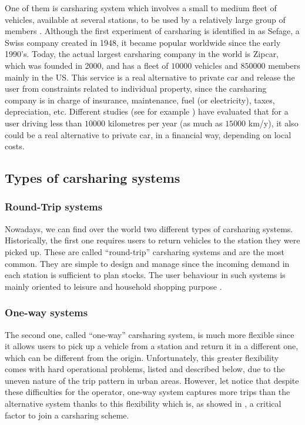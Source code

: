 \begin{bibunit}[ieeetr]
One of them is carsharing system which involves a small to medium fleet of vehicles, available at several stations, to be used by a relatively large group of members \cite{shaheen_short_1999}.
Although the first experiment of carsharing is identified in \cite{shaheen_short_1999} as Sefage, a Swiss company created in 1948, it became popular worldwide since the early 1990's.
Today, the actual largest carsharing company in the world is Zipcar, which was founded in 2000, and has a fleet of $10 000$ vehicles and $850 000$ members mainly in the US. %
This service is a real alternative to private car and release the user from constraints related to individual property, since the carsharing company is in charge of insurance, maintenance, fuel (or electricity), taxes, depreciation, etc.
Different studies (see for example \cite{litman_evaluating_2000, prettenthaler_ownership_1999}) have evaluated that for a user driving less than $10 000$ kilometres per year (as much as $15 000$ km/y), it also could be a real alternative to private car, in a financial way, depending on local costs.

\subsection{Types of carsharing systems}

\subsubsection{Round-Trip systems}
Nowadays, we can find over the world two different types of carsharing systems.
Historically, the first one requires users to return vehicles to the station they were picked up.
These are called ``round-trip'' carsharing systems and are the most common.
They are simple to design and manage since the incoming demand in each station is sufficient to plan stocks.
The user behaviour in such systems is mainly oriented to leisure and household shopping purpose \cite{barth_shared_use_2002, costain_synopsis_2012}.

\subsubsection{One-way systems}
The second one, called ``one-way'' carsharing system, is much more flexible since it allows users to pick up a vehicle from a station and return it in a different one, which can be different from the origin.
Unfortunately, this greater flexibility comes with hard operational problems, listed and described below, due to the uneven nature of the trip pattern in urban areas.
However, let notice that despite these difficulties for the operator, one-way system captures more trips than the alternative system thanks to this flexibility which is, as showed in \cite{efthymiou_which_2012}, a critical factor to join a carsharing scheme.


\end{bibunit}
